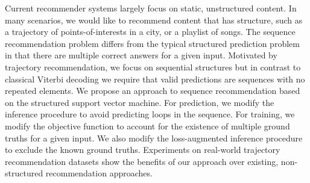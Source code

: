 
Current recommender systems largely focus on static, unstructured content.
In many scenarios, we would like to recommend content that has structure,
such as %
a trajectory of points-of-interests in a city, or a playlist of songs.
The sequence recommendation problem 
differs from the typical structured prediction problem
in that there are multiple correct answers for a given input.
Motivated by trajectory recommendation, we focus on sequential structures
but in contrast to classical Viterbi decoding we require that
valid predictions are sequences with no repeated elements.
We propose an approach to sequence recommendation based on the structured support vector machine.
For prediction, we modify the inference procedure to avoid predicting loops in the sequence.
For training, we modify the objective function to account for the existence of multiple ground truths for a given input. We also modify the loss-augmented inference procedure to exclude the known ground truths.
Experiments on real-world trajectory recommendation datasets show the benefits of our approach over existing, non-structured recommendation approaches.
